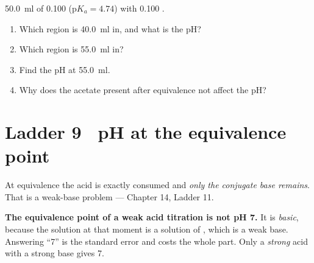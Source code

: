 \documentclass{apchem-worksheet}
\begin{document}
\begin{yourturn}
\SI{50.0}{\milli\litre} of \SI{0.100}{\Molar} 
(p$K_{a} = 4.74$) with \SI{0.100}{\Molar} .
\begin{enumerate}[leftmargin=*,itemsep=0.5em]
  \item Which region is \SI{40.0}{\milli\litre} in, and what is the pH?
        \workspace[2.0cm]
  \item Which region is \SI{55.0}{\milli\litre} in?
        \workspace[1.4cm]
  \item Find the pH at \SI{55.0}{\milli\litre}.
        \workspace[2.2cm]
  \item Why does the acetate present after equivalence not affect the
        pH? \workspace[1.8cm]
\end{enumerate}
\end{yourturn}

\section*{\sffamily Ladder 9 \textbullet\ pH at the equivalence point}

At equivalence the acid is exactly consumed and \emph{only the
conjugate base remains}. That is a weak-base problem --- Chapter 14,
Ladder 11.

\begin{apctrap}
\textbf{The equivalence point of a weak acid titration is not pH 7.} It
is \emph{basic}, because the solution at that moment is a solution of
, which is a weak base. Answering ``7'' is the standard error and
costs the whole part. Only a \emph{strong} acid with a strong base
gives 7.
\end{apctrap}
\end{document}
